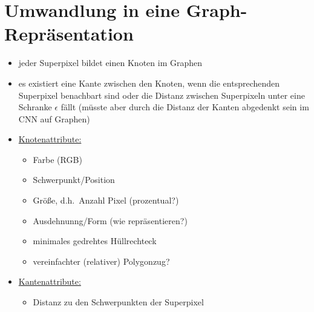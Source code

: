\section{Umwandlung in eine Graph-Repräsentation}

\begin{itemize}
  \item jeder Superpixel bildet einen Knoten im Graphen
  \item es existiert eine Kante zwischen den Knoten, wenn die entsprechenden Superpixel benachbart sind oder die Distanz zwischen Superpixeln unter eine Schranke $\epsilon$ fällt (müsste aber durch die Distanz der Kanten abgedenkt sein im CNN auf Graphen)
  \item \underline{Knotenattribute:}
  \begin{itemize}
    \item Farbe (RGB)
    \item Schwerpunkt/Position
    \item Größe, d.h.\ Anzahl Pixel (prozentual?)
    \item Ausdehnunng/Form (wie repräsentieren?)
    \item minimales gedrehtes Hüllrechteck
    \item vereinfachter (relativer) Polygonzug?
  \end{itemize}
  \item \underline{Kantenattribute:}
  \begin{itemize}
    \item Distanz zu den Schwerpunkten der Superpixel
  \end{itemize}
\end{itemize}
